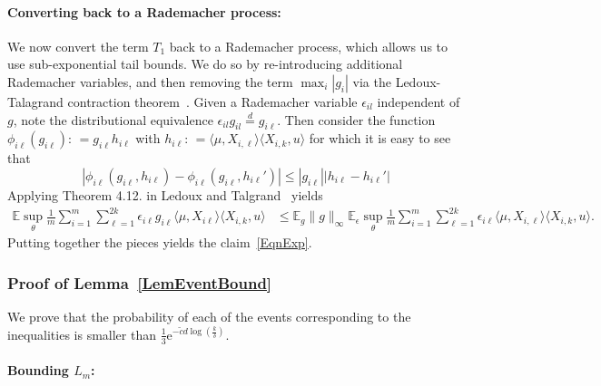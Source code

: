 \documentclass[twoside,11pt]{article}
\def\EE{ \mathbb{E} }
\def\E{ \mathrm{e} }							%
\newcommand{\paramobs}{\mu}
\newcommand{\paramjoint}{\theta}
\newcommand{\defn}{: \, = }
\newcommand{\kdim}{\ensuremath{k}}
\newcommand{\lipproc}{\ensuremath{L_m}}
\begin{document}

\paragraph{Converting back to a Rademacher process:}

We now convert the term $T_1$ back to a Rademacher process, which
allows us to use sub-exponential tail bounds. We do so by
re-introducing additional Rademacher variables, and then removing the
term $\max_i|g_i|$ via the Ledoux-Talagrand contraction
theorem~\citep{LedTalBanach}.  Given a Rademacher variable
$\epsilon_{il}$ independent of $g$, note the distributional
equivalence $\epsilon_{il} g_{il} \overset{d}{=} g_{i\ell}$.  Then
consider the function $\phi_{i\ell} (g_{i\ell}) \defn g_{i\ell}
h_{i\ell}$ with $h_{i\ell} \defn \langle \paramobs,X_{i,\ell}\rangle
\langle X_{i,k},u \rangle $ for which it is easy to see that
\begin{equation}
|\phi_{i\ell}(g_{i\ell},h_{i\ell}) - \phi_{i\ell}(g_{i\ell},
h_{i\ell}')| \leq |g_{i\ell}| |h_{i\ell}-h_{i\ell}'|
\end{equation}
Applying Theorem 4.12. in Ledoux and Talgrand~\cite{LedTalBanach}
yields
\begin{align*}
\EE \sup_{\paramjoint} \frac{1}{m}\sum_{i=1}^m \sum_{\ell=1}^{2k}
\epsilon_{i\ell} g_{i\ell} \langle \paramobs, X_{i\ell}\rangle \langle
X_{i,k},u\rangle &\leq \EE_g \|g\|_{\infty} \EE_\epsilon
\sup_{\paramjoint} \frac{1}{m}\sum_{i=1}^m \sum_{\ell=1}^{2k}
\epsilon_{i\ell} \langle \paramobs, X_{i,\ell}\rangle \langle
X_{i,k},u\rangle.
\end{align*}
Putting together the pieces yields the claim~\eqref{EqnExp}.



\subsubsection{Proof of Lemma~\ref{LemEventBound}}

We prove that the probability of each of the events corresponding to
the inequalities is smaller than $\frac{1}{3}\E^{-\tilde{c}d \log
  (\frac{\kdim}{\delta})}$.



\paragraph{Bounding $\lipproc$:}
\end{document}
